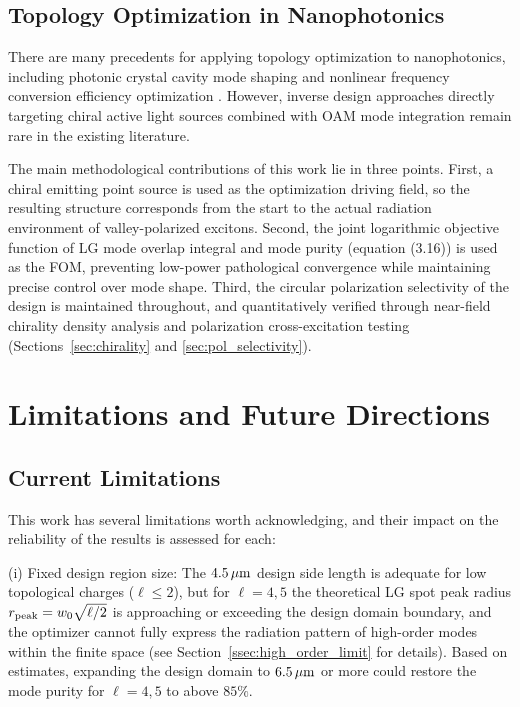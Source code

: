 \subsection{Topology Optimization in Nanophotonics}

\label{ssec:compare_topo}

There are many precedents for applying topology optimization to nanophotonics, including photonic crystal cavity mode shaping and nonlinear frequency conversion efficiency optimization \cite{Hammond2022high}. However, inverse design approaches directly targeting chiral active light sources combined with OAM mode integration remain rare in the existing literature.

The main methodological contributions of this work lie in three points. First, a chiral emitting point source is used as the optimization driving field, so the resulting structure corresponds from the start to the actual radiation environment of valley-polarized excitons. Second, the joint logarithmic objective function of LG mode overlap integral and mode purity (equation (3.16)) is used as the FOM, preventing low-power pathological convergence while maintaining precise control over mode shape. Third, the circular polarization selectivity of the design is maintained throughout, and quantitatively verified through near-field chirality density analysis and polarization cross-excitation testing (Sections~\ref{sec:chirality} and \ref{sec:pol_selectivity}).


\section{Limitations and Future Directions}

\label{sec:limitations}

\subsection{Current Limitations}

\label{ssec:current_limits}

This work has several limitations worth acknowledging, and their impact on the reliability of the results is assessed for each:

(i) Fixed design region size: The $4.5\,\mu{\rm m}$ design side length is adequate for low topological charges ($\ell \le 2$), but for $\ell = 4, 5$ the theoretical LG spot peak radius $r_{\rm peak} = w_0\sqrt{\ell/2}$ is approaching or exceeding the design domain boundary, and the optimizer cannot fully express the radiation pattern of high-order modes within the finite space (see Section~\ref{ssec:high_order_limit} for details). Based on estimates, expanding the design domain to $6.5\,\mu{\rm m}$ or more could restore the mode purity for $\ell = 4, 5$ to above $85\%$.

